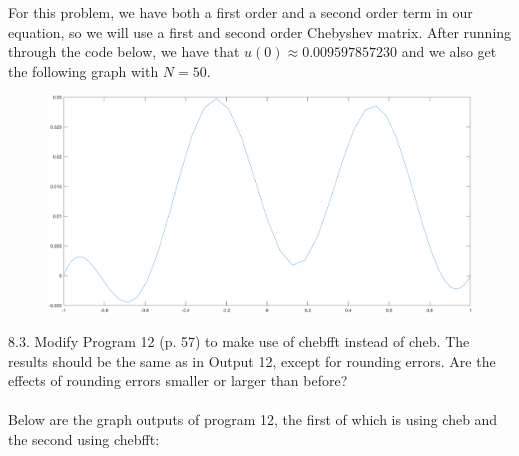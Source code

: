 \documentclass[12pt]{article}
\begin{document}
For this problem, we have both a first order and a second order term in our equation, so we will use a
first and second order Chebyshev matrix. After running through the code below, we have that
$u(0)\approx0.009597857230$ and we also get the following graph with $N=50$.

\begin{figure}[htp]
\centering
\includegraphics[scale=0.14]{7_2.PNG}
\end{figure}

\newpage

\newpage

8.3. Modify Program 12 (p. 57) to make use of chebfft instead of cheb. The results should be the same as in Output 12,
except for rounding errors. Are the effects of rounding errors smaller or larger than before?\\\\

Below are the graph outputs of program 12, the first of which is using cheb and the second using chebfft:\\
\end{document}

